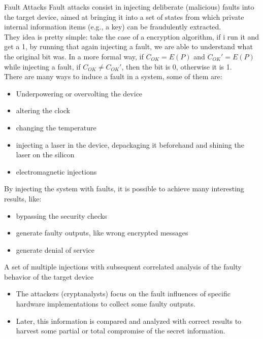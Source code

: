 \begin{chapter}{Fault Attacks}
  Fault attacks consist in injecting deliberate (malicious) faults into the target device, aimed at
  bringing it into a set of states from which private internal information items (e.g., a key) can
  be fraudulently extracted.\\
  They idea is pretty simple: take the case of a encryption algorithm, if i run it and get a 1, by
  running that again injecting a fault, we are able to understand what the original bit was. In a
  more formal way, if $C_{OK}=E(P)$ and $C_{OK}'=E(P)$ while injecting a fault, if $C_{OK} \neq
  C_{OK}'$, then the bit is 0, otherwise it is 1.\\

  There are many ways to induce a fault in a system, some of them are:
  \begin{itemize}
    \item Underpowering or overvolting the device
    \item altering the clock
    \item changing the temperature
    \item injecting a laser in the device, depackaging it beforehand and shining the laser on the
      silicon
    \item electromagnetic injections
  \end{itemize}

  By injecting the system with faults, it is possible to achieve many interesting results, like:
  \begin{itemize}
    \item bypassing the security checks
    \item generate faulty outputs, like wrong encrypted messages
    \item generate denial of service
  \end{itemize}

  A set of multiple injections with subsequent correlated analysis of the faulty behavior of the
  target device
  \begin{itemize}
    \item The attackers (cryptanalysts) focus on the fault influences of specific hardware
      implementations to collect some faulty outputs.
    \item Later, this information is compared and analyzed with correct results to harvest some
      partial or total compromise of the secret information.
  \end{itemize}


\end{chapter}
